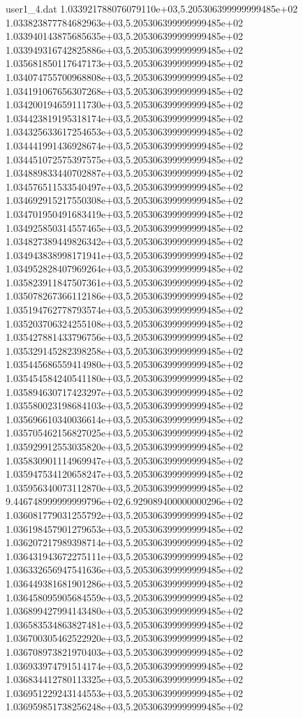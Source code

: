 \begin{filecontents}{user1_4.dat}
1.033921788076079110e+03,5.205306399999999485e+02
1.033823877784682963e+03,5.205306399999999485e+02
1.033940143875685635e+03,5.205306399999999485e+02
1.033949316742825886e+03,5.205306399999999485e+02
1.035681850117647173e+03,5.205306399999999485e+02
1.034074755700968808e+03,5.205306399999999485e+02
1.034191067656307268e+03,5.205306399999999485e+02
1.034200194659111730e+03,5.205306399999999485e+02
1.034423819195318174e+03,5.205306399999999485e+02
1.034325633617254653e+03,5.205306399999999485e+02
1.034441991436928674e+03,5.205306399999999485e+02
1.034451072575397575e+03,5.205306399999999485e+02
1.034889833440702887e+03,5.205306399999999485e+02
1.034576511533540497e+03,5.205306399999999485e+02
1.034692915217550308e+03,5.205306399999999485e+02
1.034701950491683419e+03,5.205306399999999485e+02
1.034925850314557465e+03,5.205306399999999485e+02
1.034827389449826342e+03,5.205306399999999485e+02
1.034943838998171941e+03,5.205306399999999485e+02
1.034952828407969264e+03,5.205306399999999485e+02
1.035823911847507361e+03,5.205306399999999485e+02
1.035078267366112186e+03,5.205306399999999485e+02
1.035194762778793574e+03,5.205306399999999485e+02
1.035203706324255108e+03,5.205306399999999485e+02
1.035427881433796756e+03,5.205306399999999485e+02
1.035329145282398258e+03,5.205306399999999485e+02
1.035445686559414980e+03,5.205306399999999485e+02
1.035454584240541180e+03,5.205306399999999485e+02
1.035894630717423297e+03,5.205306399999999485e+02
1.035580023198684103e+03,5.205306399999999485e+02
1.035696610340036614e+03,5.205306399999999485e+02
1.035705462156827025e+03,5.205306399999999485e+02
1.035929912553035820e+03,5.205306399999999485e+02
1.035830901114969947e+03,5.205306399999999485e+02
1.035947534120658247e+03,5.205306399999999485e+02
1.035956340073112870e+03,5.205306399999999485e+02
9.446748999999999796e+02,6.929089400000000296e+02
1.036081779031255792e+03,5.205306399999999485e+02
1.036198457901279653e+03,5.205306399999999485e+02
1.036207217989398714e+03,5.205306399999999485e+02
1.036431943672275111e+03,5.205306399999999485e+02
1.036332656947541636e+03,5.205306399999999485e+02
1.036449381681901286e+03,5.205306399999999485e+02
1.036458095905684559e+03,5.205306399999999485e+02
1.036899427994143480e+03,5.205306399999999485e+02
1.036583534863827481e+03,5.205306399999999485e+02
1.036700305462522920e+03,5.205306399999999485e+02
1.036708973821970403e+03,5.205306399999999485e+02
1.036933974791514174e+03,5.205306399999999485e+02
1.036834412780113325e+03,5.205306399999999485e+02
1.036951229243144553e+03,5.205306399999999485e+02
1.036959851738256248e+03,5.205306399999999485e+02

\end{filecontents}
